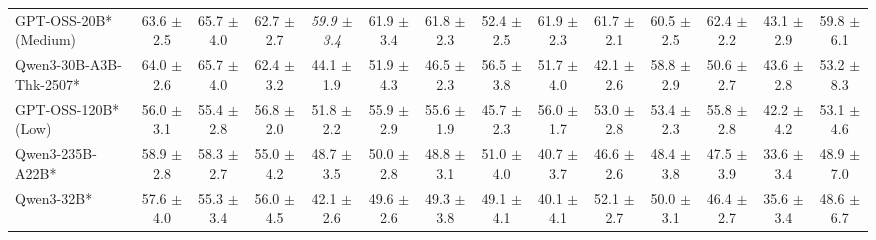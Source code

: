 \documentclass{llmxive}
\begin{document}
\begin{table}[t]
{\begin{tabular}{l *{13}{c}}

GPT-OSS-20B* (Medium)&
63.6 {\tiny$\pm$ 2.5}&
65.7 {\tiny$\pm$ 4.0}&
62.7 {\tiny$\pm$ 2.7}&
\it{59.9} {\tiny$\pm$ 3.4}&
61.9 {\tiny$\pm$ 3.4}&
61.8 {\tiny$\pm$ 2.3}&
52.4 {\tiny$\pm$ 2.5}&
61.9 {\tiny$\pm$ 2.3}&
61.7 {\tiny$\pm$ 2.1}&
60.5 {\tiny$\pm$ 2.5}&
62.4 {\tiny$\pm$ 2.2}&
43.1 {\tiny$\pm$ 2.9}&
59.8 {\tiny$\pm$ 6.1}\\		
\rowcolor{gray!10}
 Qwen3-30B-A3B-Thk-2507* &
64.0 {\tiny$\pm$ 2.6} & 
65.7 {\tiny$\pm$ 4.0} & 
62.4 {\tiny$\pm$ 3.2} &
44.1 {\tiny$\pm$ 1.9} &
51.9 {\tiny$\pm$ 4.3} & 
46.5 {\tiny$\pm$ 2.3} & 
56.5 {\tiny$\pm$ 3.8} & 
51.7 {\tiny$\pm$ 4.0} &
42.1 {\tiny$\pm$ 2.6} & 
58.8 {\tiny$\pm$ 2.9} & 
50.6 {\tiny$\pm$ 2.7} & 
43.6 {\tiny$\pm$ 2.8} &
53.2 {\tiny$\pm$ 8.3} \\
 

GPT-OSS-120B* (Low)	&
56.0 {\tiny$\pm$ 3.1} &
55.4 {\tiny$\pm$ 2.8} &
56.8 {\tiny$\pm$ 2.0} &
51.8 {\tiny$\pm$ 2.2} &
55.9 {\tiny$\pm$ 2.9} &
55.6 {\tiny$\pm$ 1.9} &
45.7 {\tiny$\pm$ 2.3} &
56.0 {\tiny$\pm$ 1.7} &
53.0 {\tiny$\pm$ 2.8} &
53.4 {\tiny$\pm$ 2.3} &
55.8 {\tiny$\pm$ 2.8} &
42.2 {\tiny$\pm$ 4.2} &
53.1 {\tiny$\pm$ 4.6} \\	

\rowcolor{gray!10}
 Qwen3-235B-A22B* &
58.9 {\tiny$\pm$ 2.8} & 
58.3 {\tiny$\pm$ 2.7} & 
55.0 {\tiny$\pm$ 4.2} & 
48.7 {\tiny$\pm$ 3.5} &
50.0 {\tiny$\pm$ 2.8} & 
48.8 {\tiny$\pm$ 3.1} & 
51.0 {\tiny$\pm$ 4.0} & 
40.7 {\tiny$\pm$ 3.7} &
46.6 {\tiny$\pm$ 2.6} & 
48.4 {\tiny$\pm$ 3.8} & 
47.5 {\tiny$\pm$ 3.9} & 
33.6 {\tiny$\pm$ 3.4} &
48.9 {\tiny$\pm$ 7.0} \\

Qwen3-32B* &
57.6 {\tiny$\pm$ 4.0} & 
55.3 {\tiny$\pm$ 3.4} & 
56.0 {\tiny$\pm$ 4.5} & 
42.1 {\tiny$\pm$ 2.6} &
49.6 {\tiny$\pm$ 2.6} & 
49.3 {\tiny$\pm$ 3.8} & 
49.1 {\tiny$\pm$ 4.1} & 
40.1 {\tiny$\pm$ 4.1} &
52.1 {\tiny$\pm$ 2.7} & 
50.0 {\tiny$\pm$ 3.1} & 
46.4 {\tiny$\pm$ 2.7} & 
35.6 {\tiny$\pm$ 3.4} &
48.6 {\tiny$\pm$ 6.7} \\



\end{tabular}}
\end{table}
\end{document}

